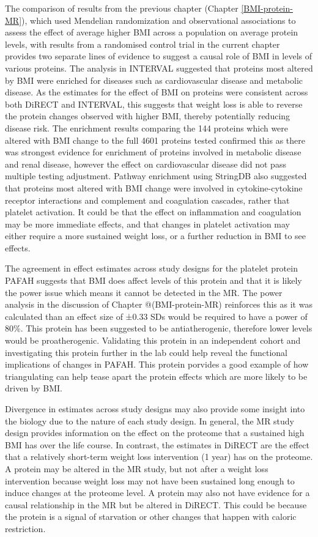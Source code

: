\documentclass[11pt,twoside]{bristolthesis}
\begin{document}
The comparison of results from the previous chapter (Chapter \ref{BMI-protein-MR}), which used Mendelian randomization and observational associations to assess the effect of average higher BMI across a population on average protein levels, with results from a randomised control trial in the current chapter provides two separate lines of evidence to suggest a causal role of BMI in levels of various proteins. The analysis in INTERVAL suggested that proteins most altered by BMI were enriched for diseases such as cardiovascular disease and metabolic disease. As the estimates for the effect of BMI on proteins were consistent across both DiRECT and INTERVAL, this suggests that weight loss is able to reverse the protein changes observed with higher BMI, thereby potentially reducing disease risk. The enrichment results comparing the 144 proteins which were altered with BMI change to the full 4601 proteins tested confirmed this as there was strongest evidence for enrichment of proteins involved in metabolic disease and renal disease, however the effect on cardiovascular disease did not pass multiple testing adjustment. Pathway enrichment using StringDB also suggested that proteins most altered with BMI change were involved in cytokine-cytokine receptor interactions and complement and coagulation cascades, rather that platelet activation. It could be that the effect on inflammation and coagulation may be more immediate effects, and that changes in platelet activation may either require a more sustained weight loss, or a further reduction in BMI to see effects.

The agreement in effect estimates across study designs for the platelet protein PAFAH suggests that BMI does affect levels of this protein and that it is likely the power issue which means it cannot be detected in the MR. The power analysis in the discussion of Chapter @(BMI-protein-MR) reinforces this as it was calculated than an effect size of ±0.33 SDs would be required to have a power of 80\%. This protein has been suggested to be antiatherogenic, therefore lower levels would be proatherogenic. Validating this protein in an independent cohort and investigating this protein further in the lab could help reveal the functional implications of changes in PAFAH. This protein porvides a good example of how triangulating can help tease apart the protein effects which are more likely to be driven by BMI.

Divergence in estimates across study designs may also provide some insight into the biology due to the nature of each study design. In general, the MR study design provides information on the effect on the proteome that a sustained high BMI has over the life course. In contrast, the estimates in DiRECT are the effect that a relatively short-term weight loss intervention (1 year) has on the proteome. A protein may be altered in the MR study, but not after a weight loss intervention because weight loss may not have been sustained long enough to induce changes at the proteome level. A protein may also not have evidence for a causal relationship in the MR but be altered in DiRECT. This could be because the protein is a signal of starvation or other changes that happen with caloric restriction.
\end{document}
